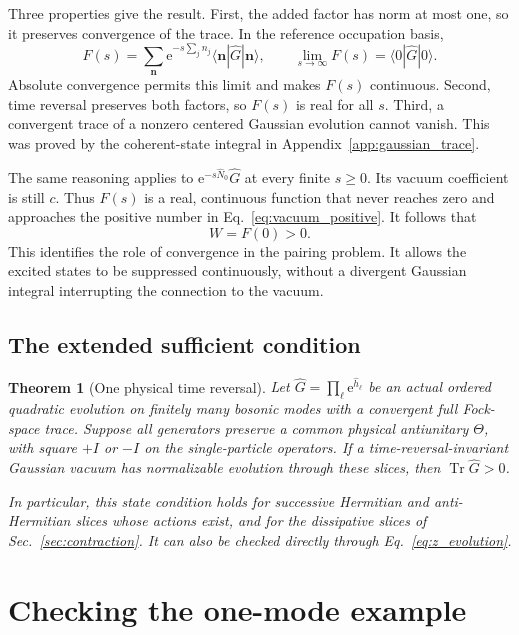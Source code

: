 \documentclass[11pt,a4paper]{article}
\newcommand{\Tr}{\operatorname{Tr}}
\newcommand{\ee}{\mathrm e}
\newcommand{\bb}[1]{\bm{#1}}
\newtheorem{theorem}{Theorem}
\numberwithin{equation}{section}
\begin{document}
Three properties give the result. First, the added factor has norm at most
one, so it preserves convergence of the trace. In the reference occupation
basis,
\begin{equation}
 F(s)=\sum_{\bb n}\ee^{-s\sum_jn_j}
 \langle\bb n|\hat G|\bb n\rangle,
 \qquad
 \lim_{s\to\infty}F(s)=\langle0|\hat G|0\rangle.
 \label{eq:filter_limit}
\end{equation}
Absolute convergence permits this limit and makes $F(s)$ continuous.
Second, time reversal preserves both factors, so $F(s)$ is real for all $s$.
Third, a convergent trace of a nonzero centered Gaussian evolution cannot
vanish. This was proved by the coherent-state integral in
Appendix~\ref{app:gaussian_trace}.

The same reasoning applies to $\ee^{-s\hat N_0}\hat G$ at every finite
$s\geq0$. Its vacuum coefficient is still $c$. Thus $F(s)$ is a real,
continuous function that never reaches zero and approaches the positive
number in Eq.~\eqref{eq:vacuum_positive}. It follows that
\begin{equation}
 \boxed{W=F(0)>0.}
 \label{eq:filter_positive}
\end{equation}
This identifies the role of convergence in the pairing problem. It allows
the excited states to be suppressed continuously, without a divergent
Gaussian integral interrupting the connection to the vacuum.

\subsection{The extended sufficient condition}

\begin{theorem}[One physical time reversal]
\label{thm:one_trs}
Let $\hat G=\prod_\ell\ee^{\hat h_\ell}$ be an actual ordered quadratic
evolution on finitely many bosonic modes with a convergent full Fock-space
trace. Suppose all generators preserve a common physical antiunitary
$\Theta$, with square $+I$ or $-I$ on the single-particle operators.
If a time-reversal-invariant Gaussian vacuum has normalizable evolution
through these slices, then $\Tr\hat G>0$.

In particular, this state condition holds for successive Hermitian and
anti-Hermitian slices whose actions exist, and for the dissipative slices of
Sec.~\ref{sec:contraction}. It can also be checked directly through
Eq.~\eqref{eq:z_evolution}.
\end{theorem}

\section{Checking the one-mode example}
\end{document}
